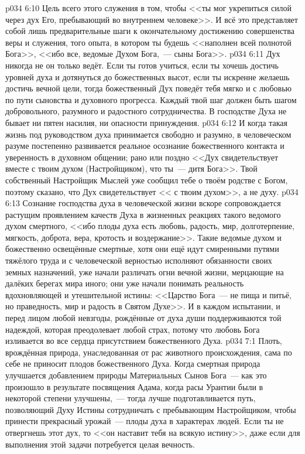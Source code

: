 \vs p034 6:10 Цель всего этого служения в том, чтобы <<ты мог укрепиться силой через дух Его, пребывающий во внутреннем человеке>>. И всё это представляет собой лишь предварительные шаги к окончательному достижению совершенства веры и служения, того опыта, в котором ты будешь <<наполнен всей полнотой Бога>>, <<ибо все, ведомые Духом Бога,~--- сыны Бога>>.
\vs p034 6:11 \pc Дух никогда не  он только ведёт. Если ты готов учиться, если ты хочешь достичь уровней духа и дотянуться до божественных высот, если ты искренне желаешь достичь вечной цели, тогда божественный Дух поведёт тебя мягко и с любовью по пути сыновства и духовного прогресса. Каждый твой шаг должен быть шагом добровольного, разумного и радостного сотрудничества. В господстве Духа не бывает ни пятен насилия, ни опасности принуждения.
\vs p034 6:12 И когда такая жизнь под руководством духа принимается свободно и разумно, в человеческом разуме постепенно развивается реальное осознание божественного контакта и уверенность в духовном общении; рано или поздно <<Дух свидетельствует вместе с твоим духом (Настройщиком), что ты~--- дитя Бога>>. Твой собственный Настройщик Мыслей уже сообщил тебе о твоём родстве с Богом, поэтому сказано, что Дух свидетельствует << с твоим духом>>, а не  духу.
\vs p034 6:13 Сознание господства духа в человеческой жизни вскоре сопровождается растущим проявлением качеств Духа в жизненных реакциях такого ведомого духом смертного, <<ибо плоды духа есть любовь, радость, мир, долготерпение, мягкость, доброта, вера, кротость и воздержание>>. Такие ведомые духом и божественно освещённые смертные, хотя они ещё идут смиренными путями тяжёлого труда и с человеческой верностью исполняют обязанности своих земных назначений, уже начали различать огни вечной жизни, мерцающие на далёких берегах мира иного; они уже начали понимать реальность вдохновляющей и утешительной истины: <<Царство Бога~--- не пища и питьё, но праведность, мир и радость в Святом Духе>>. И в каждом испытании, и перед лицом любой невзгоды, рождённые от духа души поддерживаются той надеждой, которая преодолевает любой страх, потому что любовь Бога изливается во все сердца присутствием божественного Духа.
\vs p034 7:1 Плоть, врождённая природа, унаследованная от рас животного происхождения, сама по себе не приносит плодов божественного Духа. Когда смертная природа улучшается добавлением природы Материальных Сынов Бога~--- как это произошло в результате посвящения Адама, когда расы Урантии были в некоторой степени улучшены,~--- тогда лучше подготавливается путь, позволяющий Духу Истины сотрудничать с пребывающим Настройщиком, чтобы принести прекрасный урожай~--- плоды духа в характерах людей. Если ты не отвергнешь этот дух, то <<он наставит тебя на всякую истину>>, даже если для выполнения этой задачи потребуется целая вечность.

